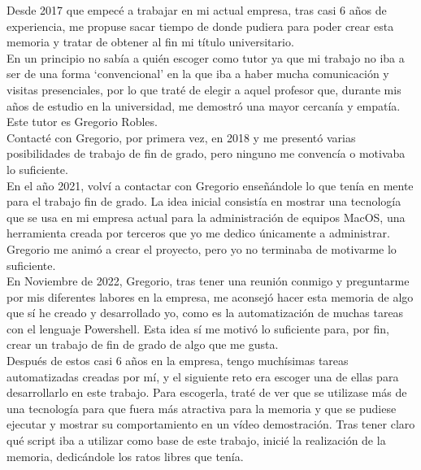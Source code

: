 \documentclass[a4paper, 12pt]{book}
\begin{document}
Desde 2017 que empecé a trabajar en mi actual empresa, tras casi 6 años de experiencia, me propuse sacar tiempo de donde pudiera para poder crear esta memoria y tratar de obtener al fin mi título universitario.
\\

En un principio no sabía a quién escoger como tutor ya que mi trabajo no iba a ser de una forma ‘convencional’ en la que iba a haber mucha comunicación y visitas presenciales, por lo que traté de elegir a aquel profesor que, durante mis años de estudio en la universidad, me demostró una mayor cercanía y empatía. Este tutor es Gregorio Robles.
\\

Contacté con Gregorio, por primera vez, en 2018 y me presentó varias posibilidades de trabajo de fin de grado, pero ninguno me convencía o motivaba lo suficiente.
\\

En el año 2021, volví a contactar con Gregorio enseñándole lo que tenía en mente para el trabajo fin de grado. La idea inicial consistía en mostrar una tecnología que se usa en mi empresa actual para la administración de equipos MacOS, una herramienta creada por terceros que yo me dedico únicamente a administrar. Gregorio me animó a crear el proyecto, pero yo no terminaba de motivarme lo suficiente.
\\

En Noviembre de 2022, Gregorio, tras tener una reunión conmigo y preguntarme por mis diferentes labores en la empresa, me aconsejó hacer esta memoria de algo que sí he creado y desarrollado yo, como es la automatización de muchas tareas con el lenguaje Powershell. Esta idea sí me motivó lo suficiente para, por fin, crear un trabajo de fin de grado de algo que me gusta.
\\

Después de estos casi 6 años en la empresa, tengo muchísimas tareas automatizadas creadas por mí, y el siguiente reto era escoger una de ellas para desarrollarlo en este trabajo. Para escogerla, traté de ver que se utilizase más de una tecnología para que fuera más atractiva para la memoria y que se pudiese ejecutar y mostrar su comportamiento en un vídeo demostración. Tras tener claro qué script iba a utilizar como base de este trabajo, inicié la realización de la memoria, dedicándole los ratos libres que tenía.

\end{document}
